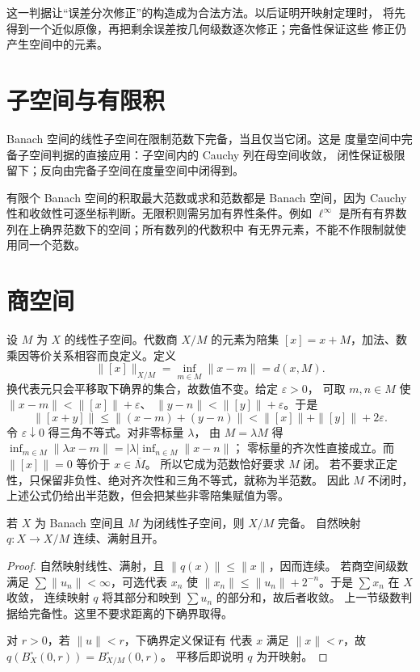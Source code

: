 这一判据让“误差分次修正”的构造成为合法方法。以后证明开映射定理时，
将先得到一个近似原像，再把剩余误差按几何级数逐次修正；完备性保证这些
修正仍产生空间中的元素。

\section{子空间与有限积}

Banach 空间的线性子空间在限制范数下完备，当且仅当它闭。这是
度量空间中完备子空间判据的直接应用：子空间内的 Cauchy 列在母空间收敛，
闭性保证极限留下；反向由完备子空间在度量空间中闭得到。

有限个 Banach 空间的积取最大范数或求和范数都是 Banach 空间，因为
Cauchy 性和收敛性可逐坐标判断。无限积则需另加有界性条件。例如
\(\ell^\infty\) 是所有有界数列在上确界范数下的空间；所有数列的代数积中
有无界元素，不能不作限制就使用同一个范数。

\section{商空间}

设 \(M\) 为 \(X\) 的线性子空间。代数商 \(X/M\) 的元素为陪集
\([x]=x+M\)，加法、数乘因等价关系相容而良定义。定义
\[
 \|[x]\|_{X/M}=\inf_{m\in M}\|x-m\|=d(x,M).
\]
换代表元只会平移取下确界的集合，故数值不变。给定 \(\varepsilon>0\)，
可取 \(m,n\in M\) 使 \(\|x-m\|<\|[x]\|+\varepsilon\)、
\(\|y-n\|<\|[y]\|+\varepsilon\)。于是
\[
 \|[x+y]\|\le\|(x-m)+(y-n)\|
 <\|[x]\|+\|[y]\|+2\varepsilon.
\]
令 \(\varepsilon\downarrow0\) 得三角不等式。对非零标量 \(\lambda\)，
由 \(M=\lambda M\) 得
\(\inf_{m\in M}\|\lambda x-m\|=|\lambda|\inf_{n\in M}\|x-n\|\)；
零标量的齐次性直接成立。而 \(\|[x]\|=0\) 等价于 \(x\in\overline M\)。
所以它成为范数恰好要求 \(M\) 闭。
若不要求正定性，只保留非负性、绝对齐次性和三角不等式，就称为半范数。
因此 \(M\) 不闭时，上述公式仍给出半范数，但会把某些非零陪集赋值为零。

\begin{theorem}\label{thm:banach-quotient}
若 \(X\) 为 Banach 空间且 \(M\) 为闭线性子空间，则 \(X/M\) 完备。
自然映射 \(q:X\to X/M\) 连续、满射且开。
\end{theorem}
\begin{proof}
自然映射线性、满射，且 \(\|q(x)\|\le\|x\|\)，因而连续。
若商空间级数满足 \(\sum\|u_n\|<\infty\)，可选代表 \(x_n\) 使
\(\|x_n\|\le\|u_n\|+2^{-n}\)。于是 \(\sum x_n\) 在 \(X\) 收敛，
连续映射 \(q\) 将其部分和映到 \(\sum u_n\) 的部分和，故后者收敛。
上一节级数判据给完备性。这里不要求距离的下确界取得。

对 \(r>0\)，若 \(\|u\|<r\)，下确界定义保证有
代表 \(x\) 满足 \(\|x\|<r\)，故 \(q(B_X^\circ(0,r))=B_{X/M}^\circ(0,r)\)。
平移后即说明 \(q\) 为开映射。
\end{proof}

